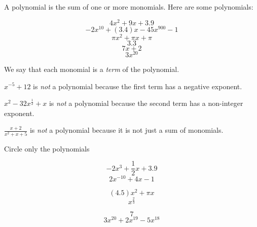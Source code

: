 A polynomial  is the sum of one or more monomials.  Here are some polynomials:
\begin{multicols}{3}
  \begin{equation*}
    4 x^2 + 9x + 3.9
  \end{equation*}
  \begin{equation*}
    -2 x^{10} + (3.4)x - 45x^{900} - 1
  \end{equation*}
  \begin{equation*}
    \pi x^2 + \pi x + \pi
  \end{equation*}
  \begin{equation*}
    3.3
  \end{equation*}
  \begin{equation*}
   7x + 2
  \end{equation*}
  \begin{equation*}
    3x^{20}
  \end{equation*}
\end{multicols}
We say that each monomial is a \emph{term} of the polynomial.

$x^{-5} + 12$ is \emph{not} a polynomial because the first term has a negative exponent.

$x^{2} - 32x^{\frac{1}{2}} + x$ is \emph{not} a polynomial because the second term has a non-integer exponent.

$\frac{x + 2}{x^2 + x + 5}$ is \emph{not} a polynomial because it is not just a sum of monomials.
\clearpage

\begin{Exercise}[title={Identifying Polynomials}, label=findpolynomials]
    Circle only the polynomials
\begin{multicols}{3}
  \begin{equation*}
    -2 x^3 + \frac{1}{2}x + 3.9
  \end{equation*}
  \begin{equation*}
    2 x^{-10} + 4x - 1
  \end{equation*}
  
  \begin{equation*}
    (4.5)x^2 + \pi x
  \end{equation*}
  \begin{equation*}
    x^{\frac{2}{3}}
  \end{equation*}
  
  \begin{equation*}
   7
  \end{equation*}
  \begin{equation*}
    3x^{20} + 2x^{19} -5 x^{18}
  \end{equation*}
\end{multicols}
\end{Exercise}

